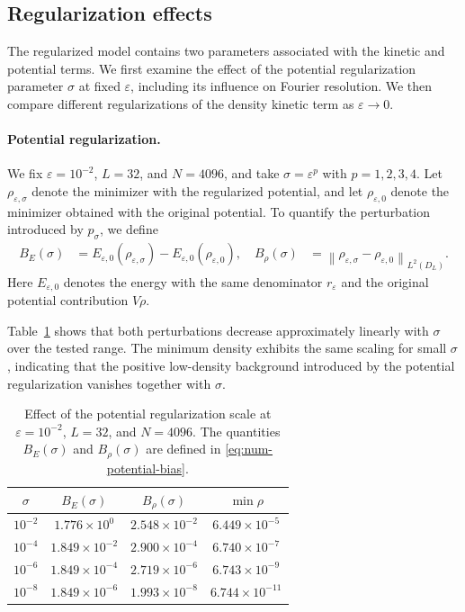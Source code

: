 \documentclass[11pt]{article}
\newcommand{\eps}{\varepsilon}
\newcommand{\sig}{\sigma}
\newcommand{\norm}[1]{\left\|#1\right\|}
\theoremstyle{plain}
\theoremstyle{definition}
\numberwithin{equation}{section}
\begin{document}
\subsection{Regularization effects}
\label{subsec:num-regularization}

The regularized model contains two parameters associated with the
kinetic and potential terms. We first examine the effect of the
potential regularization parameter $\sig$ at fixed $\eps$, including
its influence on Fourier resolution. We then compare different
regularizations of the density kinetic term as $\eps\to0$.

\paragraph{Potential regularization.}

We fix $\eps=10^{-2}$, $L=32$, and $N=4096$, and take
$\sig=\eps^p$ with $p=1,2,3,4$. Let $\rho_{\eps,\sig}$ denote the
minimizer with the regularized potential, and let $\rho_{\eps,0}$
denote the minimizer obtained with 
the original potential. To quantify the perturbation introduced
by $p_\sig$, we define
\begin{equation}
\label{eq:num-potential-bias}
\begin{aligned}
B_E(\sig)
&=
E_{\eps,0}(\rho_{\eps,\sig})
-
E_{\eps,0}(\rho_{\eps,0}),
\quad
B_\rho(\sig)
&=
\norm{
\rho_{\eps,\sig}-\rho_{\eps,0}
}_{L^2(D_L)}.
\end{aligned}
\end{equation}
Here $E_{\eps,0}$ denotes the energy with the same denominator
$r_\eps$ and the original potential contribution $V\rho$.



Table~\ref{tab:sigma-sweep} shows that both perturbations decrease
approximately linearly with $\sig$ over the tested range. The minimum
density exhibits the same scaling for small $\sig$, indicating that
the positive low-density background introduced by the potential
regularization vanishes together with $\sig$.

\begin{table}[H]
\centering
\small
\caption{
Effect of the potential regularization scale at
$\eps=10^{-2}$, $L=32$, and $N=4096$.
The quantities $B_E(\sig)$ and $B_\rho(\sig)$ are defined in
\eqref{eq:num-potential-bias}.
}
\label{tab:sigma-sweep}
\begin{tabular}{cccc}
\toprule
$\sig$
&
$B_E(\sig)$
&
$B_\rho(\sig)$
&
$\min\rho$
\\
\midrule
$10^{-2}$
& $1.776\times10^{0}$
& $2.548\times10^{-2}$
& $6.449\times10^{-5}$
\\
$10^{-4}$
& $1.849\times10^{-2}$
& $2.900\times10^{-4}$
& $6.740\times10^{-7}$
\\
$10^{-6}$
& $1.849\times10^{-4}$
& $2.719\times10^{-6}$
& $6.743\times10^{-9}$
\\
$10^{-8}$
& $1.849\times10^{-6}$
& $1.993\times10^{-8}$
& $6.744\times10^{-11}$
\\
\bottomrule
\end{tabular}
\end{table}
\end{document}
